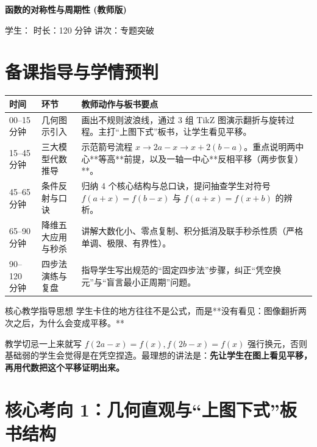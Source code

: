 \documentclass[11pt,a4paper]{ctexart}
\newcommand{\lessoninfo}[2]{%
  \begin{center}
    {\LARGE\bfseries #1 \quad (教师版)}\par
    \vspace{0.8em}
    {\small 学生：#2 \quad 时长：120 分钟 \quad 讲次：专题突破}
  \end{center}
  \vspace{0.6em}
}
\begin{document}
\lessoninfo{函数的对称性与周期性}{\blank{2.4cm}}

\section{备课指导与学情预判}

\begin{tabularx}{\textwidth}{p{2.8cm}p{3.2cm}X}
\toprule
时间 & 环节 & 教师动作与板书要点\\
\midrule
00--15 分钟 & 几何图示引入 & 画出不规则波浪线，通过 3 组 TikZ 图演示翻折与旋转过程。主打“上图下式”板书，让学生看见平移。\\ \hline
15--45 分钟 & 三大模型代数推导 & 示范箭号流程 $x \to 2a-x \to x+2(b-a)$。重点说明两中心**等高**前提，以及一轴一中心**反相平移（两步恢复）**。\\ \hline
45--65 分钟 & 条件反射与口诀 & 归纳 4 个核心结构与总口诀，提问抽查学生对符号 $f(a+x)=f(b-x)$ 与 $f(a+x)=f(x+b)$ 的辨析。\\ \hline
65--90 分钟 & 降维五大应用与秒杀 & 讲解大数化小、零点复制、积分抵消及联手秒杀性质（严格单调、极限、有界性）。\\ \hline
90--120 分钟 & 四步法演练与复盘 & 指导学生写出规范的“固定四步法”步骤，纠正“凭空换元”与“盲言最小正周期”问题。\\
\bottomrule
\end{tabularx}

\vspace{0.8em}

\begin{teachbox}{核心教学指导思想}
学生卡住的地方往往不是公式，而是**没有看见：图像翻折两次之后，为什么会变成平移。**\par
教学切忌一上来就写 $f(2a-x)=f(x), f(2b-x)=f(x)$ 强行换元，否则基础弱的学生会觉得是在凭空捏造。最理想的讲法是：\textbf{先让学生在图上看见平移，再用代数把这个平移证明出来。}
\end{teachbox}

\newpage

\section{核心考向 1：几何直观与“上图下式”板书结构}


\vspace{0.5em}

\end{document}
